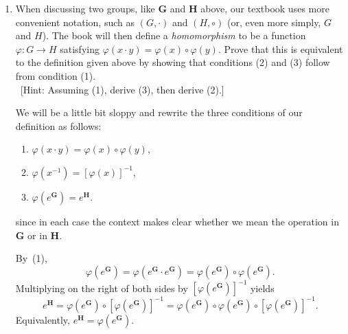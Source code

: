 \documentclass[12pt,reqno]{amsart}
\newcommand{\bG}{\ensuremath{\mathbf{G}}}
\newcommand{\bH}{\ensuremath{\mathbf{H}}}
\newcommand{\<}{\ensuremath{\langle}}
\renewcommand{\>}{\ensuremath{\rangle}}
\begin{document}
\begin{enumerate}[{\bf 1.}]
\item When discussing two groups, like $\bG$ and $\bH$ above,
  our textbook uses more convenient notation, such as 
  $(G, \cdot)$ and $(H, \circ)$ (or, even more simply, $G$ and $H$).  The book will then
  define a \emph{homomorphism} to be a function $\varphi: G\rightarrow H$ satisfying
  $\varphi(x\cdot y) = \varphi(x) \circ \varphi(y)$.
  Prove that this is equivalent to the definition given above by showing that 
  conditions (2) and (3) follow from condition (1).\\
  \ [Hint: Assuming (1), derive (3), then derive (2).]

\medskip
{} 
We will be a little bit sloppy and rewrite the three conditions of our
definition as follows:
\begin{enumerate}[(1)]
\item
$\varphi(x\cdot y) = \varphi(x) \circ \varphi(y)$,
\item 
 $\varphi(x^{-1}) = [\varphi(x)]^{-1}$,
\item 
 $\varphi(e^{\bG}) = e^{\bH}$.
\end{enumerate}
since in each case the context makes clear whether we mean the operation in $\bG$ or
in $\bH$.

\noindent
[(1) $\Rightarrow$ (3)]


\noindent
By~(1),
\[
\varphi(e^{\bG}) = \varphi(e^{\bG} \cdot e^{\bG}) = \varphi(e^{\bG}) \circ
\varphi(e^{\bG}).
\]
Multiplying on the right of both sides by $[\varphi(e^{\bG})]^{-1}$ yields
\[
e^\bH = \varphi(e^{\bG}) \circ [\varphi(e^{\bG})]^{-1} =
 \varphi(e^{\bG}) \circ \varphi(e^{\bG}) \circ [\varphi(e^{\bG})]^{-1}.
\]
Equivalently, $e^\bH = \varphi(e^{\bG})$.


\end{enumerate}
\end{document}
